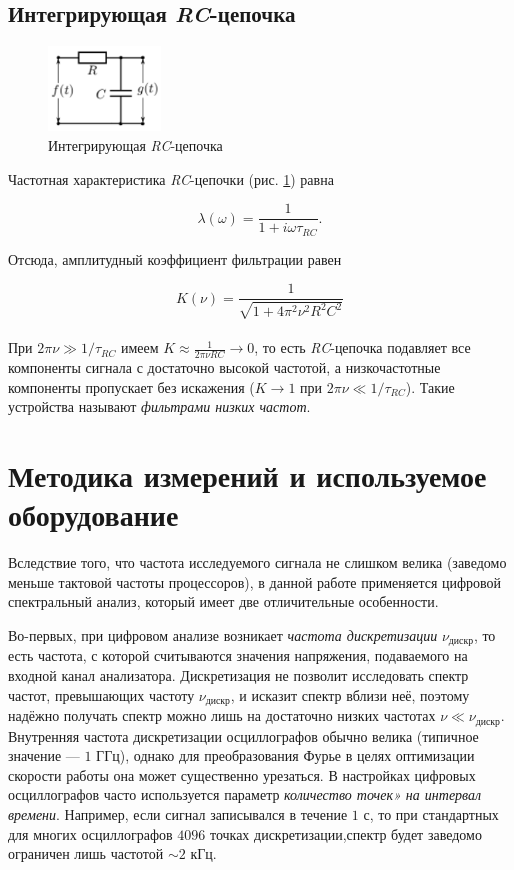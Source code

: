 \documentclass[a4paper, 12pt]{article}
\begin{document}
    \subsection{Интегрирующая \textit{RC}-цепочка}

     \begin{figure}
        \centering
	\includegraphics[width=3cm]{images/int_RC.png}
	\caption{Интегрирующая \textit{RC}-цепочка}
	\label{int_RC}
    \end{figure}

    Частотная характеристика \textit{RC}-цепочки (рис. \ref{int_RC}) равна

    \begin{equation}
        \lambda(\omega) = \frac{1}{1 + i \omega \tau_{RC}}.
    \end{equation}

    Отсюда, амплитудный коэффициент фильтрации равен

    \begin{equation}
        K(\nu) = \frac{1}{\sqrt{1 + 4\pi^2 \nu^2 R^2 C^2}}
    \end{equation}\\

    При $2\pi \nu \gg 1/\tau_{RC}$ имеем $K \approx \frac{1}{2 \pi \nu RC} \rightarrow 0$, то есть \textit{RC}-цепочка подавляет все компоненты сигнала с достаточно высокой частотой, а низкочастотные компоненты пропускает без искажения ($K \rightarrow 1$ при $2\pi \nu \ll 1/\tau_{RC} $). Такие устройства называют \textit{фильтрами низких частот}.
    
    \section{Методика измерений и используемое оборудование}

    Вследствие того, что частота исследуемого сигнала не слишком велика (заведомо меньше тактовой частоты процессоров), в данной работе применяется цифровой спектральный анализ, который имеет две отличительные особенности.

    Во-первых, при цифровом анализе возникает \textit{частота дискретизации} $\nu_\text{дискр}$, то есть частота, с которой считываются значения напряжения, подаваемого на входной канал анализатора. Дискретизация не позволит исследовать спектр частот, превышающих частоту $\nu_\text{дискр}$, и исказит спектр вблизи неё, поэтому надёжно получать спектр можно лишь на достаточно низких частотах $\nu \ll \nu_\text{дискр}$. Внутренняя частота дискретизации осциллографов обычно велика (типичное значение — $1$ ГГц), однако для преобразования Фурье в целях оптимизации скорости работы она может существенно урезаться. В настройках цифровых осциллографов часто используется параметр \textit{количество точек» на интервал времени}. Например, если сигнал записывался в течение $1$ с, то при стандартных для многих осциллографов $4096$ точках дискретизации,спектр будет заведомо ограничен лишь частотой $\sim 2$ кГц.
    
\end{document}

